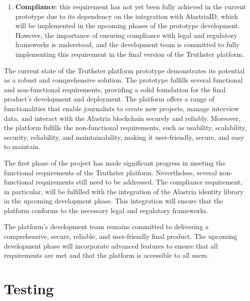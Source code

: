 \documentclass[target=mst,aauheader=]{thud}
\begin{document}
\begin{enumerate}
        \item \textbf{Compliance}: this requirement has not yet been fully achieved in the current prototype due to its dependency on the integration with AlastriaID, which will be implemented in the upcoming phases of the prototype development. However, the importance of ensuring compliance with legal and regulatory frameworks is understood, and the development team is committed to fully implementing this requirement in the final version of the Truthster platform.
    
    \end{enumerate}


The current state of the Truthster platform prototype demonstrates its potential as a robust and comprehensive solution. The prototype fulfills several functional and non-functional requirements, providing a solid foundation for the final product's development and deployment. The platform offers a range of functionalities that enable journalists to create new projects, manage interview data, and interact with the Alastria blockchain securely and reliably. Moreover, the platform fulfills the non-functional requirements, such as usability, scalability, security, reliability, and maintainability, making it user-friendly, secure, and easy to maintain.\par
The first phase of the project has made significant progress in meeting the functional requirements of the Truthster platform. Nevertheless, several non-functional requirements still need to be addressed. The compliance requirement, in particular, will be fulfilled with the integration of the Alastria identity library in the upcoming development phase. This integration will ensure that the platform conforms to the necessary legal and regulatory frameworks.\par
The platform's development team remains committed to delivering a comprehensive, secure, reliable, and user-friendly final product. The upcoming development phase will incorporate advanced features to ensure that all requirements are met and that the platform is accessible to all users.

\section{Testing}
\end{document}
